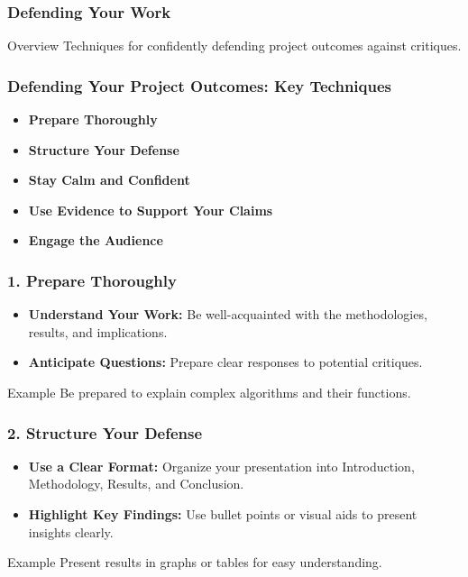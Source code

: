 \documentclass[aspectratio=169]{beamer}
\begin{document}
\begin{frame}[fragile]
    \frametitle{Defending Your Work}
    \begin{block}{Overview}
        Techniques for confidently defending project outcomes against critiques.
    \end{block}
\end{frame}

\begin{frame}[fragile]
    \frametitle{Defending Your Project Outcomes: Key Techniques}
    \begin{itemize}
        \item \textbf{Prepare Thoroughly}
        \item \textbf{Structure Your Defense}
        \item \textbf{Stay Calm and Confident}
        \item \textbf{Use Evidence to Support Your Claims}
        \item \textbf{Engage the Audience}
    \end{itemize}
\end{frame}

\begin{frame}[fragile]
    \frametitle{1. Prepare Thoroughly}
    \begin{itemize}
        \item \textbf{Understand Your Work:} 
            Be well-acquainted with the methodologies, results, and implications.
        \item \textbf{Anticipate Questions:} 
            Prepare clear responses to potential critiques.
    \end{itemize}
    \begin{exampleblock}{Example}
        Be prepared to explain complex algorithms and their functions.
    \end{exampleblock}
\end{frame}

\begin{frame}[fragile]
    \frametitle{2. Structure Your Defense}
    \begin{itemize}
        \item \textbf{Use a Clear Format:} 
            Organize your presentation into Introduction, Methodology, Results, and Conclusion.
        \item \textbf{Highlight Key Findings:} 
            Use bullet points or visual aids to present insights clearly.
    \end{itemize}
    \begin{exampleblock}{Example}
        Present results in graphs or tables for easy understanding.
    \end{exampleblock}
\end{frame}
\end{document}
